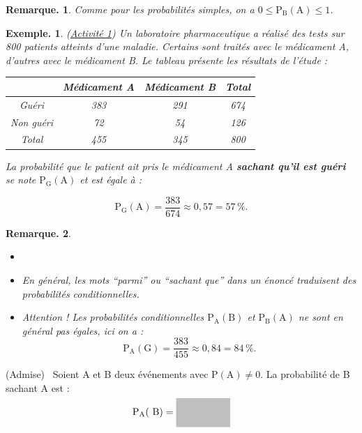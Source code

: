 \documentclass[12pt]{article}
\theoremstyle{break}
\newtheorem*{example}{Exemple.}
\newtheorem*{remark}{Remarque.}
\begin{document}
\begin{remark}
  Comme pour les probabilités simples, on a $0 \le {\mathrm P}_{\mathrm B}(\mathrm A) \le 1$.
\end{remark}

\begin{example}(\underline{Activité 1})
  Un laboratoire pharmaceutique a réalisé des tests sur 800 patients atteints d'une maladie.
  Certains sont traités avec le médicament A, d'autres avec le médicament B.
  Le tableau présente les résultats de l'étude :

  \begin{center}
    \begin{tabular}{|c|c|c|c|}
    \hline
    & Médicament A & Médicament B & Total \\
    \hline
    Guéri & 383 & 291 & 674 \\
    \hline
    Non guéri & 72 & 54 & 126 \\
    \hline
    Total & 455 & 345 & 800 \\
    \hline
    \end{tabular}
  \end{center}

  La probabilité que le patient ait pris le médicament A \textbf{sachant qu'il est guéri}
  se note $\mathrm{P}_\mathrm{G}(\mathrm{A})$ et est égale à :

  $$
  \mathrm{P}_\mathrm{G}(\mathrm{A}) = \frac{383}{674} \approx 0{,}57 = 57\,\%.
  $$
\end{example}

\begin{remark}
\begin{itemize}
  \item[]
  \item En général, les mots ``parmi'' ou ``sachant que'' dans un énoncé traduisent des probabilités conditionnelles.
  \item Attention ! Les probabilités conditionnelles $\mathrm{P}_{\mathrm{A}}(\mathrm{B})$ et $\mathrm{P}_{\mathrm{B}}(\mathrm{A})$ ne sont en général pas égales, ici on a :
  $$
  \mathrm{P}_\mathrm{A}(\mathrm{G}) = \frac{383}{455} \approx 0{,}84 = 84\,\%.
  $$
\end{itemize}
\end{remark}

\begin{proposition}{(Admise)}{}~\label{prop:formule_cond}
Soient A et B deux événements avec $\mathrm{P}(\mathrm{A}) \neq 0$.
La probabilité de B sachant A est :

$$
\mathrm{P}_{\mathrm{A}}(\mathrm{~B})=\hideM{\frac{\mathrm{P}(\mathrm{~A} \cap \mathrm{~B})}{\mathrm{P}(\mathrm{~A})}}
$$
\end{proposition}
\end{document}
